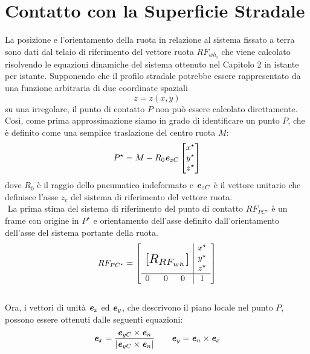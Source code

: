 %
\section{Contatto con la Superficie Stradale}
La posizione e l'orientamento della ruota in relazione al sistema fissato a terra sono dati dal telaio di riferimento del vettore ruota $RF_{wh_{i}}$ che viene calcolato risolvendo le equazioni dinamiche del sistema ottenuto nel Capitolo 2 in \cite{Larcher} istante per istante. Supponendo che il profilo stradale potrebbe essere rappresentato da una funzione arbitraria di due coordinate spaziali 
%
\begin{equation}
z=z(x,y)
\end{equation}
%
su una irregolare, il punto di contatto $P$ non può essere calcolato direttamente. Così, come prima approssimazione siamo in grado di identificare un punto $P$, che è definito come una semplice traslazione del centro ruota $M$:
%
\begin{equation}
P^\star = M-R_0\textbf{\textit{e}}_{zC}
\begin{bmatrix}
x^\star\\
y^\star\\
z^\star
\end{bmatrix}
\end{equation}
%
dove $R_0$ è il raggio dello pneumatico indeformato e $\textbf{\textit{e}}_{zC}$ è il vettore unitario che definisce l'asse $z_c$ del sistema di riferimento del vettore ruota.\\
$
$
La prima stima del sistema di riferimento del punto di contatto $RF_{PC^\star}$ è un frame con origine in $P^\star$ e orientamento dell'asse definito dall'orientamento dell'asse del sistema portante della ruota.
%
\begin{equation}
RF_{PC^\star} = \left[
\begin{array}{ccc|c}
& & & x^\star\\
\multicolumn{3}{c|}{\multirow{3}{*}{\raisebox{20mm}{\scalebox{1.5}{$[R_{RF_{wh}}]$}}}} & y^\star\\
& & & z^\star\\ \hline
0 & ~~0 & 0 & 1
\end{array}\right]
\end{equation}\\
%
Ora, i vettori di unità $\textbf{\textit{e}}_x$ ed $\textbf{\textit{e}}_y$, che descrivono il piano locale nel punto $P$, possono essere ottenuti dalle seguenti equazioni:
%
\begin{equation}
\textbf{\textit{e}}_x = \frac{\textbf{\textit{e}}_{yC}\times\textbf{\textit{e}}_{n}}{|\textbf{\textit{e}}_{yC}\times\textbf{\textit{e}}_{n}|}
\qquad
\textbf{\textit{e}}_{y} = \textbf{\textit{e}}_{n}\times\textbf{\textit{e}}_{x}
\end{equation}
